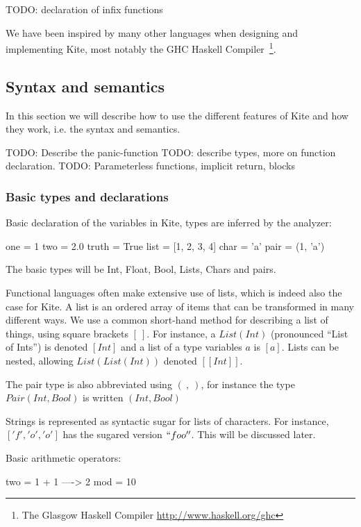 
TODO: declaration of infix functions

We have been inspired by many other languages when designing and implementing Kite, most notably the GHC Haskell Compiler~\footnote{The Glasgow Haskell Compiler \url{http://www.haskell.org/ghc}}.


\subsection{Syntax and semantics}
In this section we will describe how to use the different features of Kite and how they work, i.e. the syntax and semantics.

TODO: Describe the panic-function
TODO: describe types, more on function declaration.
TODO: Parameterless functions, implicit return, blocks


\subsubsection{Basic types and declarations}
Basic declaration of the variables in Kite, types are inferred by the analyzer:

\begin{kite}
one = 1
two = 2.0
truth = True
list = [1, 2, 3, 4]
char = 'a'
pair = (1, 'a')
\end{kite}

The basic types will be Int, Float, Bool, Lists, Chars and pairs.

Functional languages often make extensive use of lists, which is indeed also the case for Kite. A list is an ordered array of items that can be transformed in many different ways. We use a common short-hand method for describing a list of things, using square brackets $[\ ]$. For instance, a $List(Int)$ (pronounced ``List of Ints'') is denoted $[Int]$ and a list of a type variables $a$ is $[a]$. Lists can be nested, allowing $List(List(Int))$ denoted $[[Int]]$.

The pair type is also abbreviated using $(\ ,\ )$, for instance the type $Pair(Int, Bool)$ is written $(Int, Bool)$

Strings is represented as syntactic sugar for lists of characters. For instance, $['f', 'o', 'o']$ has the sugared version $``foo''$. This will be discussed later.

Basic arithmetic operators:
\begin{kite}
two = 1 + 1  ---->  2
mod = 10 %
\end{kite}

